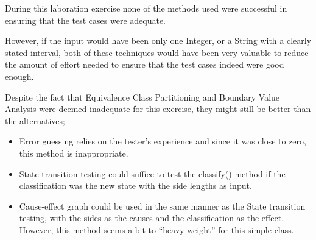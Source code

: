 During this laboration exercise none of the methods used were successful in ensuring that the test cases were adequate.

However, if the input would have been only one Integer, or a String with a clearly stated interval, both of these techniques would have been very valuable to reduce the amount of effort needed to ensure that the test cases indeed were good enough.


Despite the fact that Equivalence Class Partitioning and Boundary Value Analysis were deemed inadequate for this exercise, they might still be better than the alternatives;
\begin{itemize}
\item Error guessing relies on the tester's experience and since it was close to zero, this method is inappropriate.
\item State transition testing could suffice to test the classify() method if the classification was the new state with the side lengths as input.
\item Cause-effect graph could be used in the same manner as the State transition testing, with the sides as the causes and the classification as the effect. However, this method seems a bit to ``heavy-weight'' for this simple class.
\end{itemize}